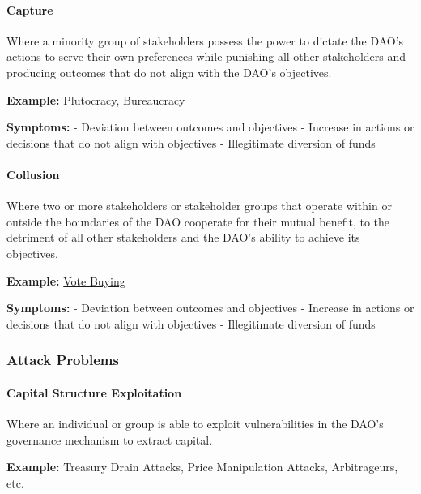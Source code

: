 \documentclass[
]{article}
\begin{document}
\hypertarget{capture}{%
\paragraph{Capture}\label{capture}}

Where a minority group of stakeholders possess the power to dictate the
DAO's actions to serve their own preferences while punishing all other
stakeholders and producing outcomes that do not align with the DAO's
objectives.

\textbf{Example:} Plutocracy, Bureaucracy

\textbf{Symptoms:} - Deviation between outcomes and objectives -
Increase in actions or decisions that do not align with objectives -
Illegitimate diversion of funds

\hypertarget{collusion}{%
\paragraph{Collusion}\label{collusion}}

Where two or more stakeholders or stakeholder groups that operate within
or outside the boundaries of the DAO cooperate for their mutual benefit,
to the detriment of all other stakeholders and the DAO's ability to
achieve its objectives.

\textbf{Example:}
\href{https://hackingdistributed.com/2018/07/02/on-chain-vote-buying/}{Vote
Buying}

\textbf{Symptoms:} - Deviation between outcomes and objectives -
Increase in actions or decisions that do not align with objectives -
Illegitimate diversion of funds

\hypertarget{attack-problems}{%
\subsubsection{Attack Problems}\label{attack-problems}}

\hypertarget{capital-structure-exploitation}{%
\paragraph{Capital Structure
Exploitation}\label{capital-structure-exploitation}}

Where an individual or group is able to exploit vulnerabilities in the
DAO's governance mechanism to extract capital.

\textbf{Example:} Treasury Drain Attacks, Price Manipulation Attacks,
Arbitrageurs, etc.
\end{document}
